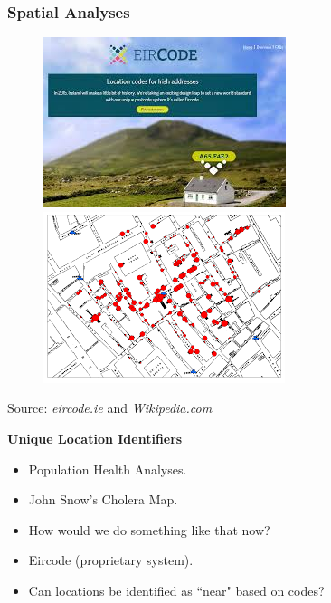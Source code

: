 \documentclass{beamer}
\begin{document}
\begin{frame}
	\frametitle{Spatial Analyses}
	\begin{figure}
		\centering
		
		\includegraphics[width=0.5\linewidth]{Eircode}
		\includegraphics[width=0.5\linewidth]{johnsnowmap}
		
	\end{figure}
{
	\normalsize Source: \textit{eircode.ie} and \textit{Wikipedia.com}
}	
\end{frame}
\begin{frame}
	\Large
	\textbf{Unique Location Identifiers}
	
	\begin{itemize}
		\item Population Health Analyses.
		\item John Snow's Cholera Map.
		\item How would we do something like that now?
		\item Eircode (proprietary system).
		\item Can locations be identified as ``near" based on codes?
	\end{itemize}
\end{frame}
\end{document}
